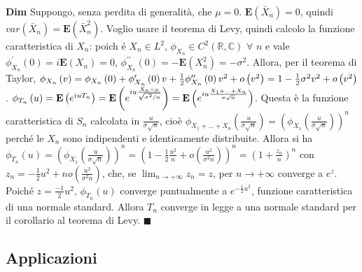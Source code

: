 \documentclass{article}
\begin{document}
\textbf{Dim} Suppongo, senza perdita di generalit\`{a}, che $\mu =0$. $%
\mathbf{E}\left( \bar{X}_{n}\right) =0$, quindi $var\left( \bar{X}%
_{n}\right) =\mathbf{E}\left( \bar{X}_{n}^{2}\right) $. Voglio usare il
teorema di Levy, quindi calcolo la funzione caratteristica di $X_{n}$: poich%
\'{e} $X_{n}\in L^{2}$, $\phi _{X_{n}}\in C^{2}\left( 
\mathbb{R}
,%
\mathbb{C}
\right) $ $\forall $ $n$ e vale $\phi _{X_{n}}^{\prime }\left( 0\right) =i%
\mathbf{E}\left( X_{n}\right) =0$, $\phi _{X_{n}}^{\prime \prime }\left(
0\right) =-\mathbf{E}\left( X_{n}^{2}\right) =-\sigma ^{2}$. Allora, per il
teorema di Taylor, $\phi _{X_{n}}\left( v\right) =\phi _{X_{n}}\left(
0\right) +\phi _{X_{n}}^{\prime }\left( 0\right) v+\frac{1}{2}\phi
_{X_{n}}^{\prime \prime }\left( 0\right) v^{2}+o\left( v^{2}\right) =1-\frac{%
1}{2}\sigma ^{2}v^{2}+o\left( v^{2}\right) $. $\phi _{T_{n}}\left( u\right) =%
\mathbf{E}\left( e^{iuT_{n}}\right) =\mathbf{E}\left( e^{iu\frac{\bar{X}%
_{n}-\mu }{\sqrt{\sigma ^{2}/n}}}\right) =\mathbf{E}\left( e^{iu\frac{%
X_{1}+...+X_{n}}{\sigma \sqrt{n}}}\right) $. Questa \`{e} la funzione
caratteristica di $S_{n}$ calcolata in $\frac{u}{\sigma \sqrt{n}}$, cio\`{e} 
$\phi _{X_{1}+...+X_{n}}\left( \frac{u}{\sigma \sqrt{n}}\right) =\left( \phi
_{X_{1}}\left( \frac{u}{\sigma \sqrt{n}}\right) \right) ^{n}$ perch\'{e} le $%
X_{n}$ sono indipendenti e identicamente distribuite. Allora si ha $\phi
_{T_{n}}\left( u\right) =\left( \phi _{X_{1}}\left( \frac{u}{\sigma \sqrt{n}}%
\right) \right) ^{n}=\left( 1-\frac{1}{2}\frac{u^{2}}{n}+o\left( \frac{u^{2}%
}{\sigma ^{2}n}\right) \right) ^{n}=\left( 1+\frac{z_{n}}{n}\right) ^{n}$
con $z_{n}=-\frac{1}{2}u^{2}+no\left( \frac{u^{2}}{\sigma ^{2}n}\right) $,
che, se $\lim_{n\rightarrow +\infty }z_{n}=z$, per $n\rightarrow +\infty $
converge a $e^{z}$. Poich\'{e} $z=\frac{-1}{2}u^{2}$, $\phi _{T_{n}}\left(
u\right) $ converge puntualmente a $e^{-\frac{1}{2}u^{2}}$, funzione
caratteristica di una normale standard. Allora $T_{n}$ converge in legge a
una normale standard per il corollario al teorema di Levy. $\blacksquare $

\subsection{Applicazioni}
\end{document}
